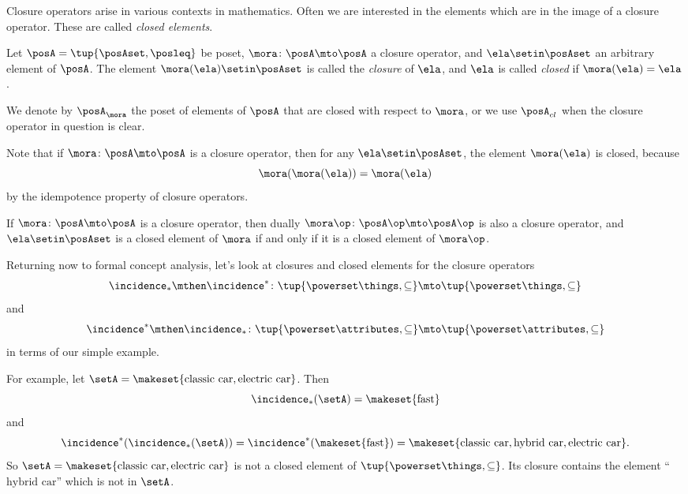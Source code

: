 Closure operators arise in various contexts in mathematics. Often we are interested in the elements which are in the image of a closure operator. These are called \emph{closed elements}. 

\begin{definition}
Let $\posA = \tup{\posAset, \posleq}$ be poset, $\mora \colon \posA \mto \posA$ a closure operator, and $\ela \setin \posAset$ an arbitrary element of $\posA$. The element $\mora(\ela) \setin \posAset$ is called the \emph{closure} of $\ela$, and $\ela$ is called \emph{closed} if $\mora(\ela) = \ela$. 

We denote by $\posA_\mora$ the poset of elements of $\posA$ that are closed with respect to $\mora$, or we use $\posA_{cl}$ when the closure operator in question is clear. 
\end{definition}

\begin{remark}\label{rem:closed-elements-are-image}
Note that if $\mora \colon \posA \mto \posA$ is a closure operator, then for any $\ela \setin \posAset$, the element $\mora(\ela)$ is closed, because
\begin{equation}
\mora(\mora(\ela)) = \mora(\ela)
\end{equation}
by the idempotence property of closure operators. 
\end{remark}

\begin{remark}\label{rem:closure-opposite-poset}
If $\mora \colon \posA \mto \posA$ is a closure operator, then dually $\mora\op \colon \posA\op \mto \posA\op$ is also a closure operator, and $\ela \setin \posAset$ is a closed element of $\mora$ if and only if it is a closed element of $\mora\op$. 
\end{remark}

Returning now to formal concept analysis, let's look at closures and closed elements for the closure operators 
$$\incidence_* \mthen \incidence^* \colon \tup{\powerset \things, \subseteq} \mto \tup{\powerset \things, \subseteq}$$  
and 
$$\incidence^* \mthen \incidence_* \colon \tup{\powerset \attributes, \subseteq} \mto \tup{\powerset \attributes, \subseteq}$$ 
in terms of our simple example. 

For example, let $\setA = \makeset{\text{classic car}, \text{electric car}}$. Then 
\begin{equation}
\incidence_*(\setA) = \makeset{\text{fast}}
\end{equation}
and 
\begin{equation}
\incidence^*(\incidence_*(\setA)) = \incidence^*(\makeset{\text{fast}}) = \makeset{\text{classic car}, \text{hybrid car}, \text{electric car}}.
\end{equation}
So $\setA = \makeset{\text{classic car}, \text{electric car}}$ is not a closed element of $\tup{\powerset \things, \subseteq}$. Its closure contains the element ``$\text{hybrid car}$'' which is not in $\setA$.

